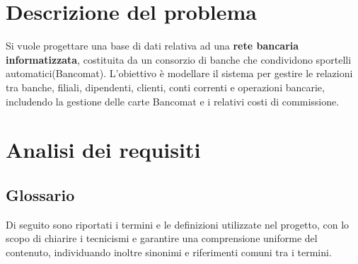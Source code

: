
\section{Descrizione del problema}
Si vuole progettare una base di dati relativa ad una \textbf{rete bancaria informatizzata}, costituita da un consorzio di banche 
che condividono sportelli automatici(Bancomat). L'obiettivo è modellare il sistema per gestire le relazioni tra banche, filiali,
dipendenti, clienti, conti correnti e operazioni bancarie, includendo la gestione delle carte Bancomat e i relativi costi di commissione.


\section{Analisi dei requisiti}

\subsection{Glossario}
Di seguito sono riportati i termini e le definizioni utilizzate nel progetto, con lo scopo di chiarire i tecnicismi e garantire una comprensione
uniforme del contenuto, individuando inoltre sinonimi e riferimenti comuni tra i termini.

